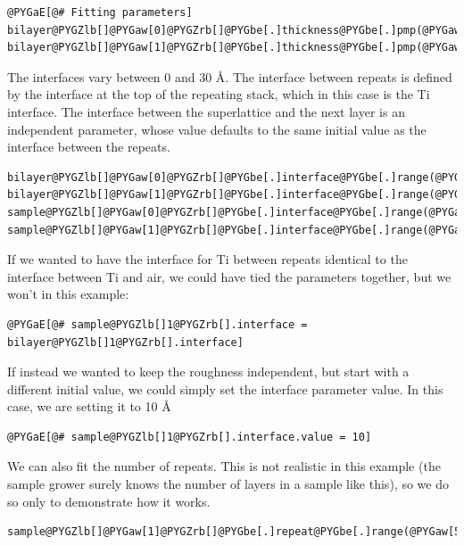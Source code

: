 \documentclass[letterpaper,10pt,english]{sphinxmanual}
\begin{document}
\begin{Verbatim}[commandchars=@\[\]]
@PYGaE[@# Fitting parameters]
bilayer@PYGZlb[]@PYGaw[0]@PYGZrb[]@PYGbe[.]thickness@PYGbe[.]pmp(@PYGaw[100])
bilayer@PYGZlb[]@PYGaw[1]@PYGZrb[]@PYGbe[.]thickness@PYGbe[.]pmp(@PYGaw[100])
\end{Verbatim}

The interfaces vary between 0 and 30 Å. The interface between repeats is
defined by the interface at the top of the repeating stack, which in this case
is the Ti interface.  The interface between the superlattice and the next
layer is an independent parameter, whose value defaults to the same initial
value as the interface between the repeats.

\begin{Verbatim}[commandchars=@\[\]]
bilayer@PYGZlb[]@PYGaw[0]@PYGZrb[]@PYGbe[.]interface@PYGbe[.]range(@PYGaw[0],@PYGaw[30])
bilayer@PYGZlb[]@PYGaw[1]@PYGZrb[]@PYGbe[.]interface@PYGbe[.]range(@PYGaw[0],@PYGaw[30])
sample@PYGZlb[]@PYGaw[0]@PYGZrb[]@PYGbe[.]interface@PYGbe[.]range(@PYGaw[0],@PYGaw[30])
sample@PYGZlb[]@PYGaw[1]@PYGZrb[]@PYGbe[.]interface@PYGbe[.]range(@PYGaw[0],@PYGaw[30])
\end{Verbatim}

If we wanted to have the interface for Ti between repeats identical to
the interface between Ti and air, we could have tied the parameters
together, but we won't in this example:

\begin{Verbatim}[commandchars=@\[\]]
@PYGaE[@# sample@PYGZlb[]1@PYGZrb[].interface = bilayer@PYGZlb[]1@PYGZrb[].interface]
\end{Verbatim}

If instead we wanted to keep the roughness independent, but start with
a different initial value, we could simply set the interface parameter
value.  In this case, we are setting it to 10 Å

\begin{Verbatim}[commandchars=@\[\]]
@PYGaE[@# sample@PYGZlb[]1@PYGZrb[].interface.value = 10]
\end{Verbatim}

We can also fit the number of repeats.  This is not realistic in this
example (the sample grower surely knows the number of layers in a
sample like this), so we do so only to demonstrate how it works.

\begin{Verbatim}[commandchars=@\[\]]
sample@PYGZlb[]@PYGaw[1]@PYGZrb[]@PYGbe[.]repeat@PYGbe[.]range(@PYGaw[5],@PYGaw[15])
\end{Verbatim}
\end{document}
